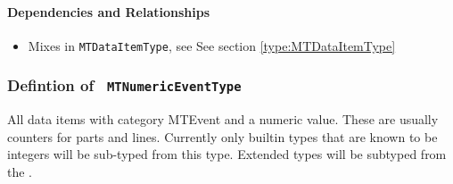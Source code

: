 \paragraph{Dependencies and Relationships}

\begin{itemize}
\item Mixes in \texttt{MTDataItemType}, see See section \ref{type:MTDataItemType}
\end{itemize}
\FloatBarrier
\subsubsection{Defintion of \texttt{ MTNumericEventType}}
  \label{type:MTNumericEventType}

\FloatBarrier

All data items with category \gls{MTEvent} and a numeric value. These are usually counters for 
parts and lines. Currently only builtin types that are known to be integers will be
sub-typed from this type. Extended types will be subtyped from the .

